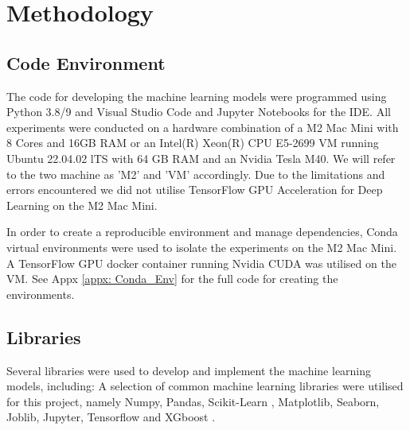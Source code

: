 
\section{Methodology}                               
\label{sec: Methodology}


\subsection{Code Environment}

The code for developing the machine learning models were programmed using Python 3.8/9 and Visual Studio Code and Jupyter Notebooks for the IDE. All experiments were conducted on a hardware combination of a M2 Mac Mini with 8 Cores and 16GB RAM or an Intel(R) Xeon(R) CPU E5-2699 VM running Ubuntu 22.04.02 lTS with 64 GB RAM and an Nvidia Tesla M40. We will refer to the two machine as 'M2' and 'VM' accordingly. Due to the limitations and errors encountered we did not utilise TensorFlow GPU Acceleration for Deep Learning on the M2 Mac Mini.

\medskip
In order to create a reproducible environment and manage dependencies, Conda virtual environments \parencite{anaconda} were used to isolate the experiments on the M2 Mac Mini. A TensorFlow GPU docker container running Nvidia CUDA was utilised on the VM. See Appx \ref{appx: Conda_Env} for the full code for creating the environments.

\subsection{Libraries}

Several libraries were used to develop and implement the machine learning models, including: 
A selection of common machine learning libraries were utilised for this project, namely Numpy, Pandas, Scikit-Learn \parencite{scikit-learn}, Matplotlib, Seaborn, Joblib, Jupyter, Tensorflow \parencite{tensorflow2015-whitepaper} and XGboost \parencite{XGBoost}. 




